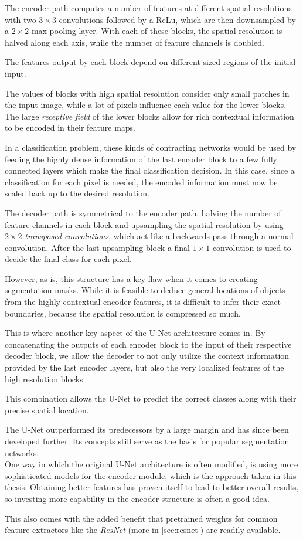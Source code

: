 The encoder path computes a number of features at different spatial resolutions with two $3\times 3$ convolutions followed by a ReLu, which are then downsampled by a $2\times 2$ max-pooling layer. 
With each of these blocks, the spatial resolution is halved along each axis, while the number of feature channels is doubled.

The features output by each block depend on different sized regions of the initial input. 

The values of blocks with high spatial resolution consider only small patches in the input image, while a lot of pixels influence each value for the lower blocks. 
The large \emph{receptive field} of the lower blocks allow for rich contextual information to be encoded in their feature maps.

In a classification problem, these kinds of contracting networks would be used by feeding the highly dense information of the last encoder block to a few fully connected layers which make the final classification decision. 
In this case, since a classification for each pixel is needed, the encoded information must now be scaled back up to the desired resolution.

The decoder path is symmetrical to the encoder path, halving the number of feature channels in each block and upsampling the spatial resolution by using $2\times 2$ \emph{transposed convolutions}, which act like a backwards pass through a normal convolution.
After the last upsampling block a final $1\times 1$ convolution is used to decide the final class for each pixel.

However, as is, this structure has a key flaw when it comes to creating segmentation masks. While it is feasible to deduce general locations of objects from the highly contextual encoder features, it is difficult to infer their exact boundaries, because the spatial resolution is compressed so much. 

This is where another key aspect of the U-Net architecture comes in. 
By concatenating the outputs of each encoder block to the input of their respective decoder block, we allow the decoder to not only utilize the context information provided by the last encoder layers, but also the very localized features of the high resolution blocks.

This combination allows the U-Net to predict the correct classes along with their precise spatial location.

The U-Net outperformed its predecessors by a large margin and has since been developed further. Its concepts still serve as the basis for popular segmentation networks.\\

One way in which the original U-Net architecture is often modified, is using more sophisticated models for the encoder module, which is the approach taken in this thesis. 
Obtaining better features has proven itself to lead to better overall results, so investing more capability in the encoder structure is often a good idea. 

This also comes with the added benefit that pretrained weights for common feature extractors like the \emph{ResNet} (more in \ref{sec:resnet}) are readily available. 